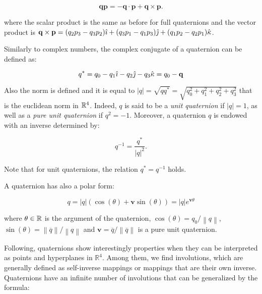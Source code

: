 \documentclass[graybox]{svmult}
\begin{document}
\begin{equation}
    \mathbf{q}\mathbf{p} = - \mathbf{q} \cdot \mathbf{p} + \mathbf{q} \times \mathbf{p}.
\end{equation}

\noindent where the scalar product is the same as before for full quaternions and the vector product is $\mathbf{q} \times \mathbf{p} = (q_2 p_3 - q_3 p_2) {\hat{\imath}} + (q_3 p_1 - q_1 p_3) {\hat{\jmath}} + (q_1 p_2 - q_2 p_1) {\hat{\kappa}}$. 

Similarly to complex numbers, the complex conjugate of a quaternion can be defined as:

\begin{equation}
    q^* = q_0 - q_1 {\hat{\imath}} - q_2 {\hat{\jmath}} - q_3 {\hat{\kappa}} = q_0 - \mathbf{q}
\end{equation}

\noindent Also the norm is defined and it is equal to $|q| = \sqrt{q q^*} =  \sqrt{q_0^2 + q_1^2 + q_2^2 + q_3^2}$ that is the euclidean norm in $\mathbb{R}^4$. Indeed, $q$ is said to be a \textit{unit quaternion} if $|q|=1$, as well as a \textit{pure unit quaternion} if $q^2 = -1$. Moreover, a quaternion $q$ is endowed with an inverse determined by:

\begin{equation*}
    q^{-1} = \frac{q^*}{|q|^2}.
\end{equation*}

\noindent Note that for unit quaternions, the relation $q^* = q^{-1}$ holds.

A quaternion has also a polar form: 

\begin{equation}
    q = \left|q\right|\left(\cos\left(\theta\right) + \mathbf{v}\sin\left(\theta\right)\right) = \left|q\right|e^{\mathbf{v}\theta}
\end{equation}
 
\noindent where $\theta \in \mathbb{R}$ is the argument of the quaternion, $\cos\left(\theta\right) = q_0/\left\|q\right\|$,  $\sin\left(\theta\right) = \left\|\overline{q}\right\|/\left\|q\right\|$ and $\mathbf{v} = \overline{q}/\left\|\overline{q}\right\|$ is a pure unit quaternion.

Following, quaternions show interestingly properties when they can be interpreted as points and hyperplanes in $\mathbb{R}^4$. Among them, we find involutions, which are generally defined as self-inverse mappings or mappings that are their own inverse.
Quaternions have an infinite number of involutions \cite{ELL2007137} that can be generalized by the formula:
\end{document}
